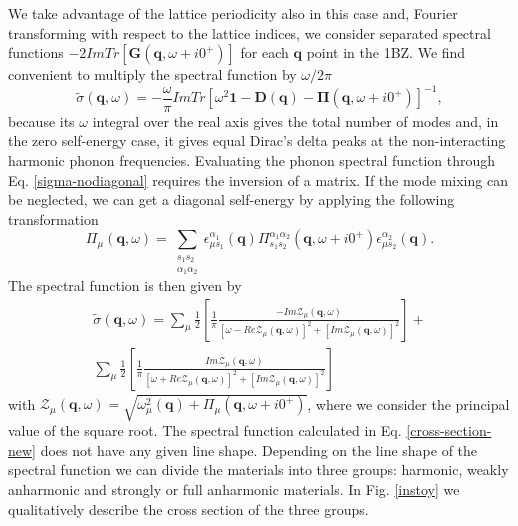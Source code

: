 We take advantage of the lattice periodicity also in this case and, Fourier transforming with respect to the lattice indices, we consider separated spectral functions $-2ImTr[\boldsymbol{G}(\boldsymbol{q},\omega+i0^{+})]$ for 
each $\boldsymbol{q}$ point in the 1BZ. We find convenient to multiply the spectral function by $\omega/2\pi$
\begin{equation}
\label{sigma-nodiagonal}
\tilde{\sigma}(\mathbf{q},\omega)=-\frac{\omega}{\pi}ImTr[\omega^{2}\boldsymbol{1}-\mathbf{D}(\mathbf{q})-\boldsymbol{\Pi}(\mathbf{q},\omega+i0^{+})]^{-1},
\end{equation}
because its $\omega$ integral over the real axis gives the total number of modes and, in the zero self-energy case, it gives equal Dirac's delta peaks at the non-interacting harmonic phonon frequencies. Evaluating the 
phonon spectral function through Eq. \ref{sigma-nodiagonal} requires the inversion of a matrix. If the mode mixing can be neglected, we can get a diagonal self-energy by applying the following transformation
\begin{equation}
\Pi_{\mu}(\mathbf{q},\omega)=\sum\limits_{\substack{s_{1}s_{2} \\ \alpha_{1}\alpha_{2}}}\epsilon_{\mu s_{1}}^{\alpha_{1}}(\mathbf{q})\Pi_{s_{1}s_{2}}^{\alpha_{1}\alpha_{2}}(\mathbf{q},\omega+i0^{+})\epsilon_{
 \mu s_{2}}^{\alpha_{2}}(\mathbf{q}).
\end{equation}
The spectral function is then given by
\begin{multline}
\label{cross-section-new}
\tilde{\sigma}(\mathbf{q},\omega)=\sum_{\mu}\frac{1}{2}\left[\frac{1}{\pi}\frac{-Im\mathcal{Z}_{\mu}(\mathbf{q},\omega)}{[\omega-Re\mathcal{Z}_{\mu}(\mathbf{q},\omega)]^{2}+[Im\mathcal{Z}_{\mu}(\mathbf{q},\omega)]^{
2}}\right]+\\\sum_{\mu}\frac{1}{2}\left[\frac{1}{\pi}\frac{Im\mathcal{Z}_{\mu}(\mathbf{q},\omega)}{[\omega+Re\mathcal{Z}_{\mu}(\mathbf{q},\omega)]^{2}+[Im\mathcal{Z}_{\mu}(\mathbf{q},\omega)]^{2}}\right]
\end{multline}
with $\mathcal{Z}_{\mu}(\mathbf{q},\omega)=\sqrt{\omega_{\mu}^{2}(\mathbf{q})+\Pi_{\mu}(\mathbf{q},\omega+i0^{+})}$, where we consider the principal value of the square root.  
The spectral function calculated in Eq. \ref{cross-section-new} does not have any given line shape. Depending on the line shape of the spectral function we can divide the materials into three groups: harmonic, weakly 
anharmonic and strongly or full anharmonic materials. In Fig. \ref{instoy} we qualitatively describe the cross section of the three groups.
